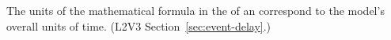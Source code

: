 The units of the mathematical formula in the  of an \Event
{} correspond to the model's overall units of time.  (L2V3
Section~\ref{sec:event-delay}.)
